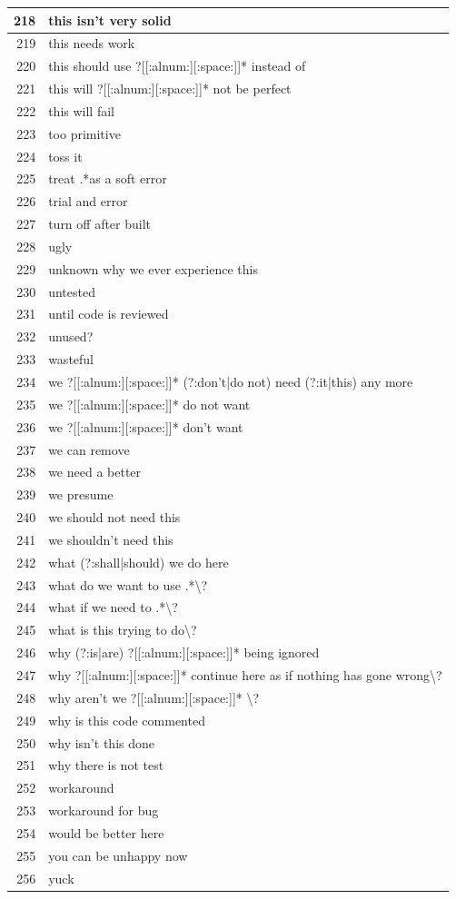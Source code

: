 \documentclass[
]{article}
\begin{document}
\begin{longtable}{r|l}
\hline
218 & this isn't very solid\\
\hline
219 & this needs work\\
\hline
220 & this should use ?[[:alnum:][:space:]]* instead of\\
\hline
221 & this will ?[[:alnum:][:space:]]* not be perfect\\
\hline
222 & this will fail\\
\hline
223 & too primitive\\
\hline
224 & toss it\\
\hline
225 & treat .*as a soft error\\
\hline
226 & trial and error\\
\hline
227 & turn off after built\\
\hline
228 & ugly\\
\hline
229 & unknown why we ever experience this\\
\hline
230 & untested\\
\hline
231 & until code is reviewed\\
\hline
232 & unused?\\
\hline
233 & wasteful\\
\hline
234 & we ?[[:alnum:][:space:]]* (?:don't|do not) need (?:it|this) any more\\
\hline
235 & we ?[[:alnum:][:space:]]* do not want\\
\hline
236 & we ?[[:alnum:][:space:]]* don't want\\
\hline
237 & we can remove\\
\hline
238 & we need a better\\
\hline
239 & we presume\\
\hline
240 & we should not need this\\
\hline
241 & we shouldn't need this\\
\hline
242 & what (?:shall|should) we do here\\
\hline
243 & what do we want to use .*\textbackslash{}?\\
\hline
244 & what if we need to .*\textbackslash{}?\\
\hline
245 & what is this trying to do\textbackslash{}?\\
\hline
246 & why (?:is|are) ?[[:alnum:][:space:]]* being ignored\\
\hline
247 & why ?[[:alnum:][:space:]]* continue here as if nothing has gone wrong\textbackslash{}?\\
\hline
248 & why aren't we ?[[:alnum:][:space:]]* \textbackslash{}?\\
\hline
249 & why is this code commented\\
\hline
250 & why isn't this done\\
\hline
251 & why there is not test\\
\hline
252 & workaround\\
\hline
253 & workaround for bug\\
\hline
254 & would be better here\\
\hline
255 & you can be unhappy now\\
\hline
256 & yuck\\
\hline
\end{longtable}
\end{document}
